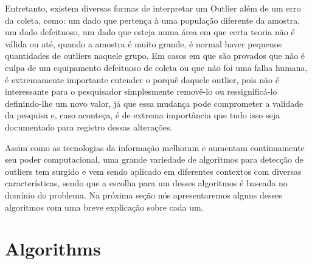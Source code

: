 
Entretanto, existem diversas formas de interpretar um Outlier além de um erro da coleta, como: um dado que pertença à uma população diferente da amostra, um dado defeituoso, um dado que esteja numa área em que certa teoria não é válida ou até, quando a amostra é muito grande, é normal haver pequenos quantidades de outliers naquele grupo. Em casos em que são provados que não é culpa de um equipamento defeituoso de coleta ou que não foi uma falha humana, é extremamente importante entender o porquê daquele outlier, pois não é interessante para o pesquisador simplesmente removê-lo ou ressignificá-lo definindo-lhe um novo valor, já que essa mudança pode comprometer a validade da pesquisa e, caso aconteça, é de extrema importância que tudo isso seja documentado para registro dessas alterações.


Assim como as tecnologias da informação melhoram e aumentam continuamente seu poder computacional, uma grande variedade de algoritmos para detecção de outliers tem surgido e vem sendo aplicado em diferentes contextos com diversas características, sendo que a escolha para um desses algoritmos é baseada no domínio do problema. Na próxima seção nós apresentaremos alguns desses algoritmos com uma breve explicação sobre cada um.

\section{Algorithms}

